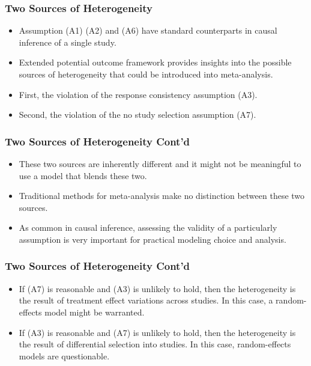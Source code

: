 \documentclass[xetex,mathserif,serif]{beamer}
\begin{document}
\begin{frame}
  \frametitle{Two Sources of Heterogeneity}
  \begin{itemize}
  \item Assumption (A1) (A2) and (A6) have standard counterparts in causal
    inference of a single study.  
    \pause
  \item Extended potential outcome framework provides insights into the possible
    sources of heterogeneity that could be introduced into meta-analysis.
    \pause
  \item First, the violation of the response consistency assumption (A3).
  \item Second, the violation of the no study selection assumption (A7).
  \end{itemize}
\end{frame}

\begin{frame}
  \frametitle{Two Sources of Heterogeneity Cont'd}
  \begin{itemize}
  \item These two sources are inherently different and it might not be meaningful
    to use a model that blends these two.
  \item Traditional methods for meta-analysis make no distinction between these
    two sources.
    \pause
  \item As common in causal inference, assessing the validity of a particularly
    assumption is very important for practical modeling choice and analysis.
  \end{itemize}
\end{frame}

\begin{frame}
  \frametitle{Two Sources of Heterogeneity Cont'd}
  \begin{itemize}
  \item If (A7) is reasonable and (A3) is unlikely to hold, then the
    heterogeneity is the result of treatment effect variations across studies. In this
    case, a random-effects model might be warranted.
    \pause
  \item If (A3) is reasonable and (A7) is unlikely to hold, then the
    heterogeneity is the result of differential selection into studies. In this
    case, random-effects models are questionable.
  \end{itemize}
\end{frame}
\end{document}
